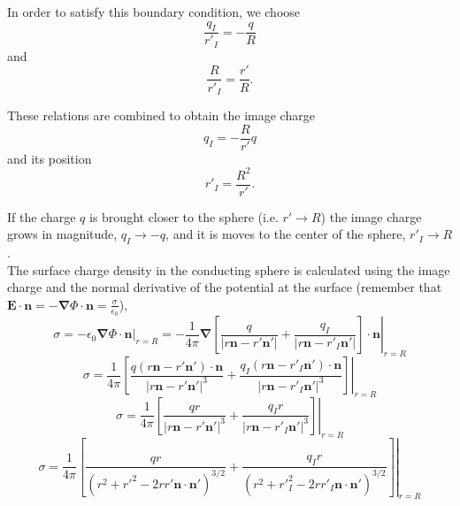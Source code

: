 In order to satisfy this boundary condition, we choose
\begin{equation}
\frac{q_I}{r'_I} = -\frac{q}{R} 
\end{equation}
and
\begin{equation}
\frac{R}{r'_I} = \frac{r'}{R}.
\end{equation}

These relations are combined to obtain the image charge
\begin{equation}
 q_I = -\frac{R}{r'} q
 \end{equation}
and its position
\begin{equation}
r'_I = \frac{R^2}{r'}.
\end{equation}

If the charge $q$ is brought closer to the sphere (i.e. $r' \rightarrow R$) the image charge grows in magnitude, $q_I \rightarrow -q$, and it is moves to the center of the sphere, $r'_I \rightarrow R$. \\
The surface charge density in the conducting sphere is calculated using the image charge and the normal derivative of the potential at the surface (remember that $ \textbf{E}  \cdot \textbf{n}= -\boldsymbol{\nabla} \Phi \cdot \textbf{n} = \frac{\sigma}{\epsilon_0}$),
\begin{equation}
 \sigma = -\epsilon_0 \left. \boldsymbol{\nabla} \Phi \cdot \textbf{n}  \right|_{r=R} = - \frac{1}{4 \pi } \left. \boldsymbol{\nabla} \left[  \frac{q}{\left| r \textbf{n} - r' \textbf{n}' \right|} + \frac{q_I}{\left| r \textbf{n} - r'_I \textbf{n}' \right|} \right] \cdot \textbf{n}  \right|_{r=R}   
 \end{equation} 
\begin{equation}
 \sigma =  \frac{1}{4 \pi } \left. \left[  \frac{q (r \textbf{n} - r' \textbf{n}' ) \cdot \textbf{n} }{\left| r \textbf{n} - r' \textbf{n}' \right|^3 } + \frac{q_I (r \textbf{n} - r'_I \textbf{n}')\cdot \textbf{n} }{\left| r \textbf{n} - r'_I \textbf{n}' \right|^3} \right]  \right|_{r=R}   
 \end{equation} 
\begin{equation}
 \sigma =  \frac{1}{4 \pi } \left. \left[  \frac{q r }{\left| r \textbf{n} - r' \textbf{n}' \right|^3 } + \frac{q_I r }{\left| r \textbf{n} - r'_I \textbf{n}' \right|^3} \right]  \right|_{r=R}   
 \end{equation} 
\begin{equation}
 \sigma =  \frac{1}{4 \pi } \left. \left[  \frac{q r }{\left(r^2 + r'^2 - 2 rr' \textbf{n} \cdot \textbf{n}' \right)^{3/2} } + \frac{q_I r }{\left(r^2 + r'^2_I - 2 rr'_I \textbf{n} \cdot \textbf{n}' \right)^{3/2}} \right]  \right|_{r=R}   
 \end{equation} 
